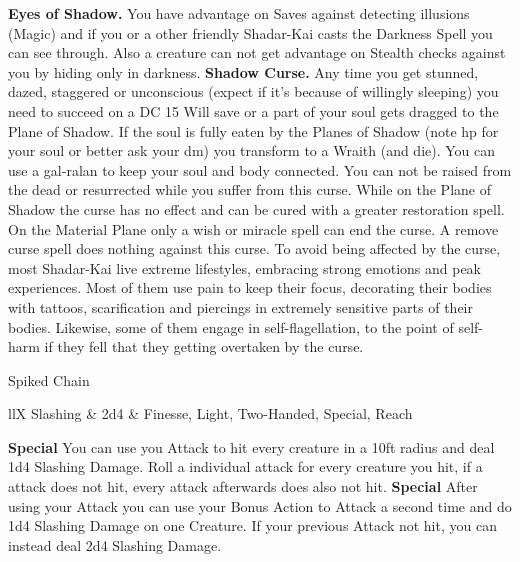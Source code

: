 \documentclass[a4paper,10pt,twoside,twocolumn]{dndbook} %
\begin{document}
	\textbf{Eyes of Shadow.} You have advantage on Saves against detecting illusions (Magic) and if you or a other friendly Shadar-Kai casts the Darkness Spell you can see through. Also a creature can not get advantage on Stealth checks against you by hiding only in darkness.
	\textbf{Shadow Curse.} Any time you get stunned, dazed, staggered or unconscious (expect if it's because of willingly sleeping) you need to succeed on a DC 15 Will save or a part of your soul gets dragged to the Plane of Shadow. If the soul is fully eaten by the Planes of Shadow (note hp for your soul or better ask your dm) you transform to a Wraith (and die). You can use a gal-ralan to keep your soul and body connected. You can not be raised from the dead or resurrected while you suffer from this curse. While on the Plane of Shadow the curse has no effect and can be cured with a greater restoration spell. On the Material Plane only a wish or miracle spell can end the curse. A remove curse spell does nothing against this curse.\linebreak
	To avoid being affected by the curse, most Shadar-Kai live extreme lifestyles, embracing strong emotions and peak experiences. Most of them use pain to keep their focus, decorating their bodies with tattoos, scarification and piercings in extremely sensitive parts of their bodies. Likewise, some of them engage in self-flagellation, to the point of self-harm if they fell that they getting overtaken by the curse.
	\begin{DndSidebar}{Spiked Chain}
		\begin{DndTable}{llX}
			Slashing & 2d4 & Finesse, Light, Two-Handed, Special, Reach
		\end{DndTable}
		\textbf{Special} You can use you Attack to hit every creature in a 10ft radius and deal 1d4 Slashing Damage. Roll a individual attack for every creature you hit, if a attack does not hit, every attack afterwards does also not hit.\linebreak
		\textbf{Special} After using your Attack you can use your Bonus Action to Attack a second time and do 1d4 Slashing Damage on one Creature. If your previous Attack not hit, you can instead deal 2d4 Slashing Damage.
	\end{DndSidebar}
	
	
\end{document}
